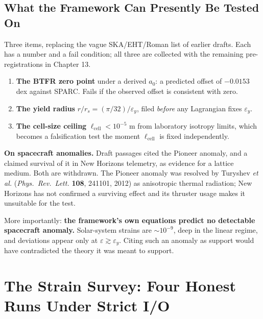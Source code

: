 \documentclass[11pt, letterpaper, openany]{book}
\begin{document}
\section{What the Framework Can Presently Be Tested On}

Three items, replacing the vague SKA/EHT/Roman list of earlier drafts. Each has a number and a fail
condition; all three are collected with the remaining pre-registrations in Chapter 13.

\begin{enumerate}
  \item \textbf{The BTFR zero point} under a derived $a_0$: a predicted offset of
        $\mathbf{-0.0153}$ dex against SPARC. Fails if the observed offset is consistent with zero.
  \item \textbf{The yield radius} $r/r_s = (\pi/32)/\varepsilon_y$, filed \emph{before} any
        Lagrangian fixes $\varepsilon_y$.
  \item \textbf{The cell-size ceiling} $\ell_{\mathrm{cell}} < 10^{-5}$ m from laboratory isotropy
        limits, which becomes a falsification test the moment $\ell_{\mathrm{cell}}$ is fixed
        independently.
\end{enumerate}

\begin{warningbox}
\textbf{On spacecraft anomalies.} Draft passages cited the Pioneer anomaly, and a claimed survival of
it in New Horizons telemetry, as evidence for a lattice medium. Both are withdrawn. The Pioneer
anomaly was resolved by Turyshev \textit{et al.} (\textit{Phys.\ Rev.\ Lett.} \textbf{108}, 241101,
2012) as anisotropic thermal radiation; New Horizons has not confirmed a surviving effect and its
thruster usage makes it unsuitable for the test.

\medskip
More importantly: \textbf{the framework's own equations predict no detectable spacecraft anomaly.}
Solar-system strains are $\sim 10^{-9}$, deep in the linear regime, and deviations appear only at
$\varepsilon \gtrsim \varepsilon_y$. Citing such an anomaly as support would have contradicted the
theory it was meant to support.
\end{warningbox}


\chapter{The Strain Survey: Four Honest Runs Under Strict I/O}
\end{document}
